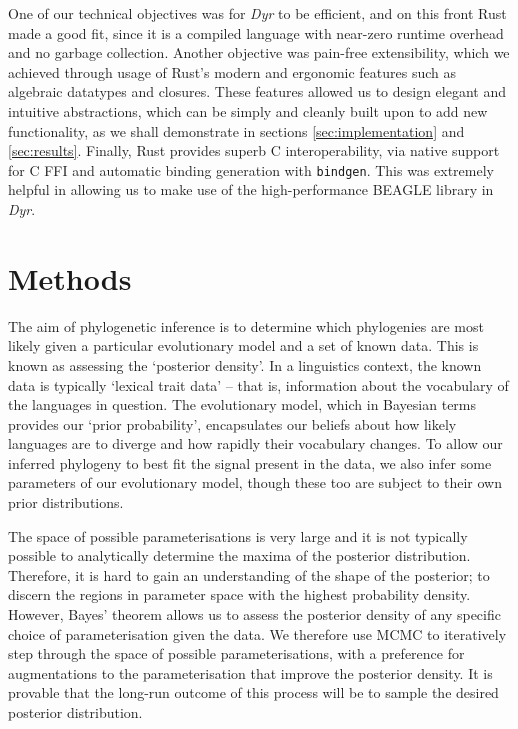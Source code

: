 \documentclass[10pt,journal,compsoc]{IEEEtran}
\begin{document}
One of our technical objectives was for \textit{Dyr} to be efficient, and on this front Rust made a good fit, since it is a compiled language with near-zero runtime overhead and no garbage collection\cite{matsakis2014rust}. Another objective was pain-free extensibility, which we achieved through usage of Rust's modern and ergonomic features such as algebraic datatypes and closures. These features allowed us to design elegant and intuitive abstractions, which can be simply and cleanly built upon to add new functionality, as we shall demonstrate in sections \ref{sec:implementation} and \ref{sec:results}. Finally, Rust provides superb C interoperability, via native support for C FFI and automatic binding generation with \texttt{bindgen}. This was extremely helpful in allowing us to make use of the high-performance BEAGLE library in \textit{Dyr}.

\section{Methods}\label{sec:methods}

The aim of phylogenetic inference is to determine which phylogenies are most likely given a particular evolutionary model and a set of known data. This is known as assessing the `posterior density'. In a linguistics context, the known data is typically `lexical trait data' -- that is, information about the vocabulary of the languages in question. The evolutionary model, which in Bayesian terms provides our `prior probability', encapsulates our beliefs about how likely languages are to diverge and how rapidly their vocabulary changes. To allow our inferred phylogeny to best fit the signal present in the data, we also infer some parameters of our evolutionary model, though these too are subject to their own prior distributions.

The space of possible parameterisations is very large and it is not typically possible to analytically determine the maxima of the posterior distribution. Therefore, it is hard to gain an understanding of the shape of the posterior; to discern the regions in parameter space with the highest probability density. However, Bayes' theorem allows us to assess the posterior density of any specific choice of parameterisation given the data. We therefore use MCMC to iteratively step through the space of possible parameterisations, with a preference for augmentations to the parameterisation that improve the posterior density. It is provable that the long-run outcome of this process will be to sample the desired posterior distribution\cite{chib1995understanding}.
\end{document}

